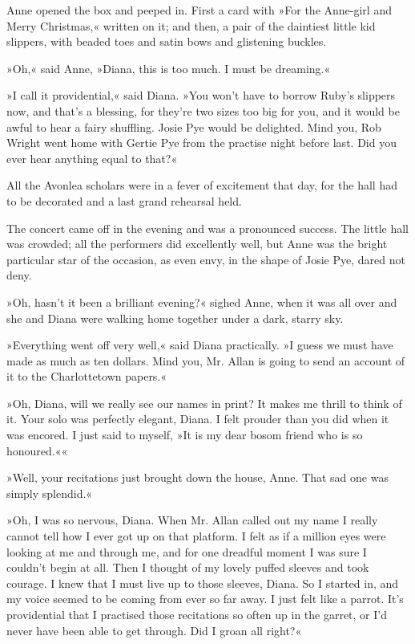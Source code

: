 Anne opened the box and peeped in. First a card with »For the Anne-girl and Merry Christmas,« written on it; and then, a pair of the daintiest little kid slippers, with beaded toes and satin bows and glistening buckles.

»Oh,« said Anne, »Diana, this is too much. I must be dreaming.«

»I call it providential,« said Diana. »You won't have to borrow Ruby's slippers now, and that's a blessing, for they're two sizes too big for you, and it would be awful to hear a fairy shuffling. Josie Pye would be delighted. Mind you, Rob Wright went home with Gertie Pye from the practise night before last. Did you ever hear anything equal to that?«

All the Avonlea scholars were in a fever of excitement that day, for the hall had to be decorated and a last grand rehearsal held.

The concert came off in the evening and was a pronounced success. The little hall was crowded; all the performers did excellently well, but Anne was the bright particular star of the occasion, as even envy, in the shape of Josie Pye, dared not deny.

»Oh, hasn't it been a brilliant evening?« sighed Anne, when it was all over and she and Diana were walking home together under a dark, starry sky.

»Everything went off very well,« said Diana practically. »I guess we must have made as much as ten dollars. Mind you, Mr. Allan is going to send an account of it to the Charlottetown papers.«

»Oh, Diana, will we really see our names in print? It makes me thrill to think of it. Your solo was perfectly elegant, Diana. I felt prouder than you did when it was encored. I just said to myself, »It is my dear bosom friend who is so honoured.««

»Well, your recitations just brought down the house, Anne. That sad one was simply splendid.«

»Oh, I was so nervous, Diana. When Mr. Allan called out my name I really cannot tell how I ever got up on that platform. I felt as if a million eyes were looking at me and through me, and for one dreadful moment I was sure I couldn't begin at all. Then I thought of my lovely puffed sleeves and took courage. I knew that I must live up to those sleeves, Diana. So I started in, and my voice seemed to be coming from ever so far away. I just felt like a parrot. It's providential that I practised those recitations so often up in the garret, or I'd never have been able to get through. Did I groan all right?«

